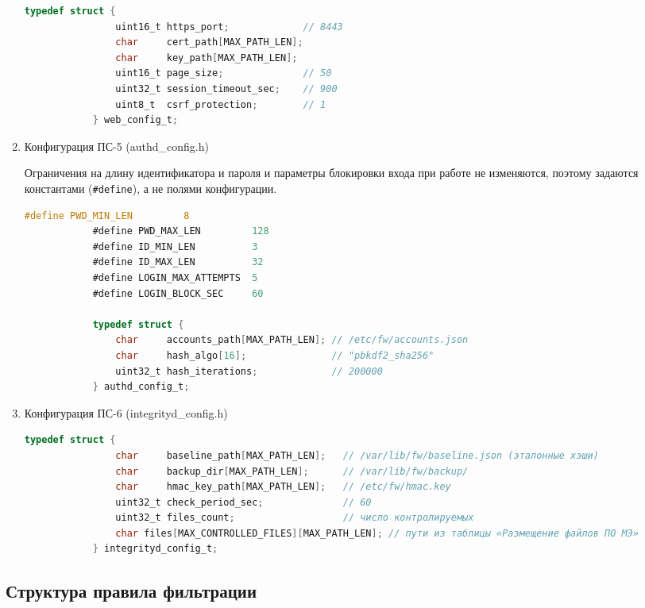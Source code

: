 \documentclass[13pt,a4paper,final]{article}
\begin{document}
\begin{enumerate}
		\begin{lstlisting}[language=C, caption={web\_config.h}]
			typedef struct {
				uint16_t https_port;             // 8443
				char     cert_path[MAX_PATH_LEN];
				char     key_path[MAX_PATH_LEN];
				uint16_t page_size;              // 50
				uint32_t session_timeout_sec;    // 900
				uint8_t  csrf_protection;        // 1
			} web_config_t;
		\end{lstlisting}
		
		\item{Конфигурация ПС-5 (authd\_config.h)}
		
		Ограничения на длину идентификатора и пароля и параметры блокировки входа при работе не изменяются, поэтому задаются константами (\texttt{\#define}), а не полями конфигурации.
		
		\begin{lstlisting}[language=C, caption={authd\_config.h}]
			#define PWD_MIN_LEN         8
			#define PWD_MAX_LEN         128
			#define ID_MIN_LEN          3
			#define ID_MAX_LEN          32
			#define LOGIN_MAX_ATTEMPTS  5
			#define LOGIN_BLOCK_SEC     60
			
			typedef struct {
				char     accounts_path[MAX_PATH_LEN]; // /etc/fw/accounts.json
				char     hash_algo[16];               // "pbkdf2_sha256"
				uint32_t hash_iterations;             // 200000
			} authd_config_t;
		\end{lstlisting}
		
		\item{Конфигурация ПС-6 (integrityd\_config.h)}
		
		\begin{lstlisting}[language=C, caption={integrityd\_config.h}]
			typedef struct {
				char     baseline_path[MAX_PATH_LEN];   // /var/lib/fw/baseline.json (эталонные хэши)
				char     backup_dir[MAX_PATH_LEN];      // /var/lib/fw/backup/
				char     hmac_key_path[MAX_PATH_LEN];   // /etc/fw/hmac.key
				uint32_t check_period_sec;              // 60
				uint32_t files_count;                   // число контролируемых
				char files[MAX_CONTROLLED_FILES][MAX_PATH_LEN]; // пути из таблицы «Размещение файлов ПО МЭ»
			} integrityd_config_t;
		\end{lstlisting}
		
	\end{enumerate}
	\subsection{Структура правила фильтрации}
	
\end{document}

